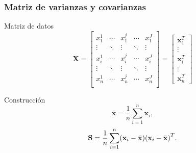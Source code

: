 \documentclass[table]{beamer}
\begin{document}
\begin{frame}
    \frametitle{Matriz de varianzas y covarianzas}
    \begin{block}{Matriz de datos}
        \begin{equation*}
            \mathbf{X} =
            \begin{bmatrix}
                x^{1}_{1} & \cdots & x^{j}_{1} & \cdots & x^{J}_{1} \\
                \vdots & \ddots & \vdots & \ddots & \vdots \\
                x^{1}_{i} & \cdots & x^{j}_{i} & \cdots & x^{J}_{i} \\
                \vdots & \ddots & \vdots & \ddots & \vdots \\
                x^{1}_{n} & \cdots & x^{j}_{n} & \cdots & x^{J}_{n} \\
            \end{bmatrix}
            =
            \begin{bmatrix}
                \mathbf{x}_{1}^{T} \\
                \vdots \\
                \mathbf{x}_{i}^{T} \\
                \vdots \\
                \mathbf{x}_{n}^{T}
            \end{bmatrix}
        \end{equation*}
    \end{block}
    \begin{block}{Construcción}
        \begin{equation*}
            \bar{\mathbf{x}} = \frac{1}{n} \sum_{i = 1}^{n} \mathbf{x}_{i} ,
        \end{equation*}
        \begin{equation*}
            \mathbf{S} = \frac{1}{n} \sum_{i = 1}^{n} \parens{\mathbf{x}_{i} - \bar{\mathbf{x}}} \parens{\mathbf{x}_{i} - \bar{\mathbf{x}}}^{T} .
        \end{equation*}
    \end{block}
\end{frame}
\end{document}
